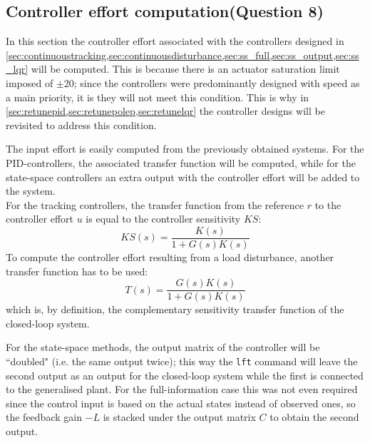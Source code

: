 \subsection{Controller effort computation\textnormal{\phantom{xxx}(Question 8)}}
In this section the controller effort associated with the controllers designed in \cref{sec:continuoustracking,sec:continuousdisturbance,sec:ss_full,sec:ss_output,sec:ss_lqr} will be computed. This is because there is an actuator saturation limit imposed of $\pm20$; since the controllers were predominantly designed with speed as a main priority, it is they will not meet this condition. This is why in \cref{sec:retunepid,sec:retunepolep,sec:retunelqr} the controller designs will be revisited to address this condition.

The input effort is easily computed from the previously obtained systems. For the PID-controllers, the associated transfer function will be computed, while for the state-space controllers an extra output with the controller effort will be added to the system.\\
\indent For the tracking controllers, the transfer function from the reference $r$ to the controller effort $u$ is equal to the controller sensitivity $KS$:
$$ KS(s) = \frac{K(s)}{1 + G(s)K(s)} $$
To compute the controller effort resulting from a load disturbance, another transfer function has to be used:
$$ T(s) = \frac{G(s)K(s)}{1 + G(s)K(s)}$$
which is, by definition, the complementary sensitivity transfer function of the closed-loop system. 

For the state-space methods, the output matrix of the controller will be ``doubled" (i.e. the same output twice); this way the \texttt{lft} command will leave the second output as an output for the closed-loop system while the first is connected to the generalised plant. For the full-information case this was not even required since the control input is based on the actual states instead of observed ones, so the feedback gain $-L$ is stacked under the output matrix $C$ to obtain the second output.

